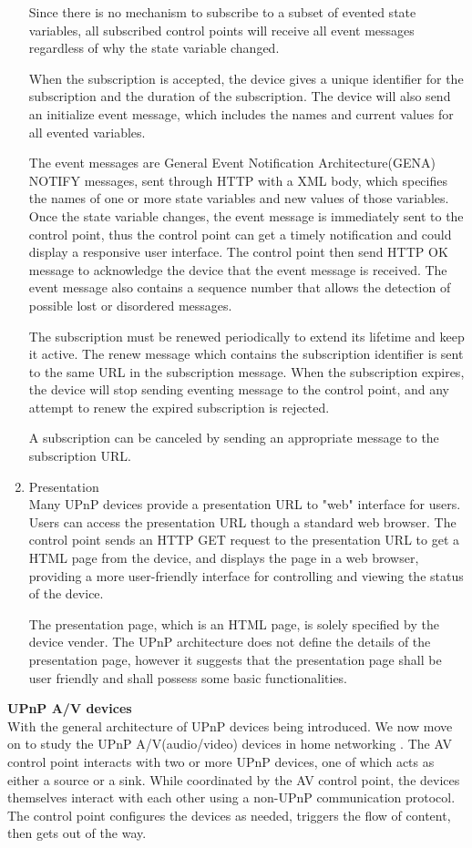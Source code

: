 \begin{enumerate}
Since there is no mechanism to subscribe to a subset of evented state variables, all subscribed 
control points will receive all event messages regardless of why the state variable changed. 

When the subscription is accepted, the device gives a unique identifier for the subscription and 
the duration of the subscription. The device will also send an initialize event message, which 
includes the names and current values for all evented variables. 

The event messages are General Event Notification Architecture(GENA) NOTIFY 
messages, sent through HTTP with a XML body, which specifies the names of one or 
more state variables and new values of those variables. Once the state variable 
changes, the event message is immediately sent to the control point, thus the 
control point can get a timely notification and could display a responsive user 
interface. The control point then send HTTP OK message to acknowledge the device 
that the event message is received. The event message also contains a sequence 
number that allows the detection of possible lost or disordered messages. 

The subscription must be renewed periodically to extend its lifetime and keep it active. The renew 
message which contains the subscription identifier is sent to the same URL in the subscription 
message. When the subscription expires, the device will stop sending eventing message to the 
control point, and any attempt to renew the expired subscription is rejected. 

A subscription can be canceled by sending an appropriate message to the subscription URL. 

\item Presentation \\ 
Many UPnP devices provide a presentation URL to "web" interface for users. Users can access the 
presentation URL though a standard web browser. The control point sends an HTTP GET request to the 
presentation URL to get a HTML page from the device, and displays the page in a web browser, 
providing a more user-friendly interface for controlling and viewing the status of the device. 

The presentation page, which is an HTML page, is solely specified by the device vender.
The UPnP architecture does not define the details of the presentation page,
however it suggests that the presentation page shall be user friendly and shall
possess some basic functionalities.
\end{enumerate}
\textbf{UPnP A/V devices}\\
With the general architecture of UPnP devices being introduced. We now move on to study the UPnP A/V(audio/video) devices in home networking \label{upnpav}. The AV 
control point interacts with two or more UPnP devices, one of which acts as either a source or a 
sink. While coordinated by the AV control point, the devices themselves interact with each other using a non-UPnP communication protocol. The control point configures the devices as needed, triggers the flow of content, then gets out of the way. 

